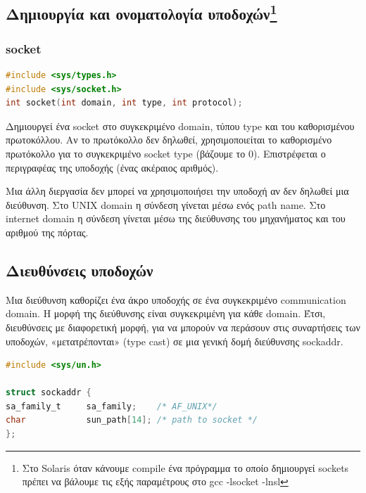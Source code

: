 \subsection*{Δημιουργία και ονοματολογία υποδοχών\footnote{Στο Solaris όταν κάνουμε compile ένα πρόγραμμα το οποίο δημιουργεί sockets
		πρέπει να βάλουμε τις εξής παραμέτρους στο gcc -lsocket -lnsl }}

\subsubsection*{socket}

\begin{lstlisting}[language=C,breaklines=true, frame=none, backgroundcolor=\color{lightgray}, basicstyle=\footnotesize\ttfamily]
#include <sys/types.h>          
#include <sys/socket.h>
int socket(int domain, int type, int protocol); 
\end{lstlisting}


Δημιουργεί ένα socket στο συγκεκριμένο domain, τύπου type και του καθορισμένου πρωτοκόλλου. Αν το πρωτόκολλο δεν δηλωθεί, χρησιμοποιείται το
καθορισμένο πρωτόκολλο για το συγκεκριμένο socket type (βάζουμε το 0). Επιστρέφεται ο περιγραφέας της υποδοχής (ένας ακέραιος αριθμός).

Μια άλλη διεργασία δεν μπορεί να χρησιμοποιήσει την υποδοχή αν δεν δηλωθεί μια διεύθυνση. Στο UNIX domain η σύνδεση γίνεται μέσω ενός path
name. Στο internet domain η σύνδεση γίνεται μέσω της διεύθυνσης του μηχανήματος και του αριθμού της πόρτας. 

\subsection*{Διευθύνσεις υποδοχών}

Μια διεύθυνση καθορίζει ένα άκρο υποδοχής σε ένα συγκεκριμένο communication domain. Η μορφή της διεύθυνσης είναι συγκεκριμένη για κάθε
domain. Έτσι, διευθύνσεις με διαφορετική μορφή, για να μπορούν να περάσουν στις συναρτήσεις των υποδοχών, «μετατρέπονται» (type cast) σε
μια γενική δομή διεύθυνσης sockaddr. 


\begin{lstlisting}[float, language=C,breaklines=true, frame=none, backgroundcolor=\color{lightgray}, basicstyle=\footnotesize\ttfamily]
#include <sys/un.h>

struct sockaddr {
sa_family_t 	sa_family;    /* AF_UNIX*/
char        	sun_path[14]; /* path to socket */
};
\end{lstlisting}

